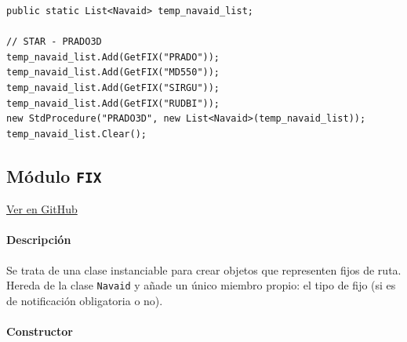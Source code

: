 \begin{table}[!hbtp]
	\caption{Ejemplo de instancia al constructor de la clase \texttt{StdProcedure}.}
	\label{tab:EjemploStdProcedure}
\end{table}
\vspace{-0.8cm}
\begin{scriptsize}
{\color{gray}
\begin{Verbatim}[frame=single]
public static List<Navaid> temp_navaid_list;

// STAR - PRADO3D
temp_navaid_list.Add(GetFIX("PRADO"));
temp_navaid_list.Add(GetFIX("MD550"));
temp_navaid_list.Add(GetFIX("SIRGU"));
temp_navaid_list.Add(GetFIX("RUDBI"));
new StdProcedure("PRADO3D", new List<Navaid>(temp_navaid_list));
temp_navaid_list.Clear();
\end{Verbatim}
}
\end{scriptsize}







\clearpage

\subsection{Módulo \texttt{FIX}}
\label{subsec:ClaseFIX}

\vspace{-0.85cm}
\begin{flushright}
\href{https://github.com/macgyver912/atc-simulator/blob/jaime/Assets/Scripts/navaids/FIX.cs}{Ver en GitHub \faGithub}
\end{flushright}

\paragraph{Descripción} \phantom{\newline}

Se trata de una clase instanciable para crear objetos que representen fijos de ruta. Hereda de la clase \texttt{Navaid} y añade un único miembro propio: el tipo de fijo (si es de notificación obligatoria o no).

\paragraph{Constructor} \phantom{\newline}

